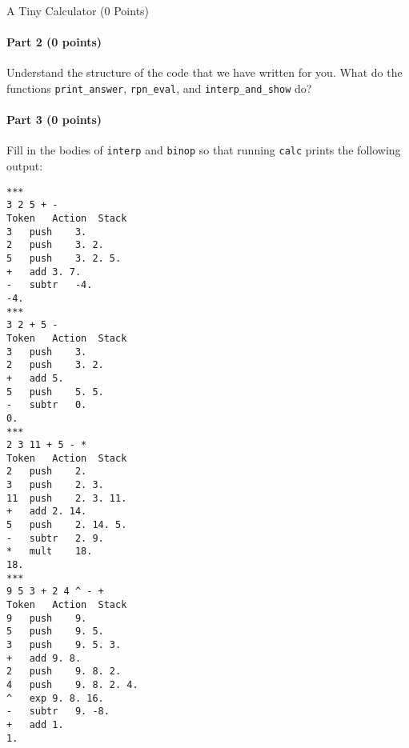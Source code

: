 \documentclass[11pt]{article}
\begin{document}
\begin{problem}{A Tiny Calculator (0 Points)}
\paragraph{Part 2 (0 points)}
Understand the structure of the code that we have written for you. What do the functions \texttt{print\_answer}, \texttt{rpn\_eval}, and \texttt{interp\_and\_show} do?

\paragraph{Part 3 (0 points)}
Fill in the bodies of \texttt{interp} and \texttt{binop} so that running \texttt{calc} prints the following output:
\begin{verbatim}
***
3 2 5 + -
Token	Action	Stack
3	push	3. 
2	push	3. 2. 
5	push	3. 2. 5. 
+	add	3. 7. 
-	subtr	-4. 
-4.
***
3 2 + 5 -
Token	Action	Stack
3	push	3. 
2	push	3. 2. 
+	add	5. 
5	push	5. 5. 
-	subtr	0. 
0.
***
2 3 11 + 5 - *
Token	Action	Stack
2	push	2. 
3	push	2. 3. 
11	push	2. 3. 11. 
+	add	2. 14. 
5	push	2. 14. 5. 
-	subtr	2. 9. 
*	mult	18. 
18.
***
9 5 3 + 2 4 ^ - +
Token	Action	Stack
9	push	9. 
5	push	9. 5. 
3	push	9. 5. 3. 
+	add	9. 8. 
2	push	9. 8. 2. 
4	push	9. 8. 2. 4. 
^	exp	9. 8. 16. 
-	subtr	9. -8. 
+	add	1. 
1.
\end{verbatim}

\end{problem}
\end{document}
